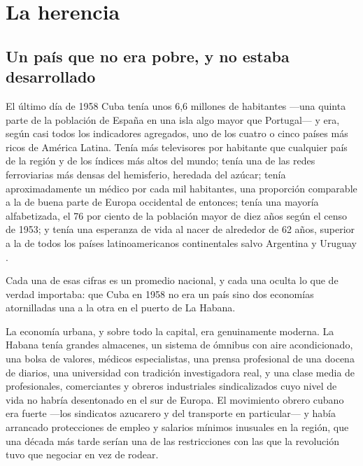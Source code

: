 \chapter{La herencia}
\label{ch:inheritance}

\section{Un país que no era pobre, y no estaba desarrollado}

El último día de 1958 Cuba tenía unos 6,6 millones de habitantes ---una quinta
parte de la población de España en una isla algo mayor que Portugal--- y era,
según casi todos los indicadores agregados, uno de los cuatro o cinco países más
ricos de América Latina.\unv{} Tenía más televisores por habitante que cualquier
país de la región y de los índices más altos del mundo; tenía una de las redes
ferroviarias más densas del hemisferio, heredada del azúcar; tenía
aproximadamente un médico por cada mil habitantes, una proporción comparable a
la de buena parte de Europa occidental de entonces; tenía una mayoría
alfabetizada, el 76 por ciento de la población mayor de diez años según el censo
de 1953; y tenía una esperanza de vida al nacer de alrededor de 62 años, superior
a la de todos los países latinoamericanos continentales salvo Argentina y
Uruguay \citep{perezjr2015}.\unv{}

Cada una de esas cifras es un promedio nacional, y cada una oculta lo que de
verdad importaba: que Cuba en 1958 no era un país sino dos economías atornilladas
una a la otra en el puerto de La Habana.

La economía urbana, y sobre todo la capital, era genuinamente moderna. La Habana
tenía grandes almacenes, un sistema de ómnibus con aire acondicionado, una bolsa
de valores, médicos especialistas, una prensa profesional de una docena de
diarios, una universidad con tradición investigadora real, y una clase media de
profesionales, comerciantes y obreros industriales sindicalizados cuyo nivel de
vida no habría desentonado en el sur de Europa. El movimiento obrero cubano era
fuerte ---los sindicatos azucarero y del transporte en particular--- y había
arrancado protecciones de empleo y salarios mínimos inusuales en la región, que
una década más tarde serían una de las restricciones con las que la revolución
tuvo que negociar en vez de rodear.

